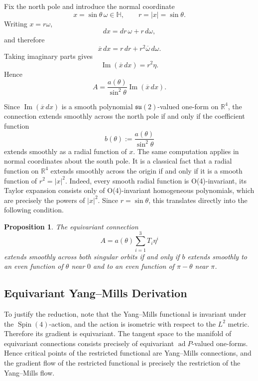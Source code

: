 \documentclass[11pt,a4paper]{article}
\numberwithin{equation}{section}
\theoremstyle{plain}
\newtheorem{proposition}[theorem]{Proposition}
\theoremstyle{remark}
\begin{document}
Fix the north pole and introduce the normal coordinate
$$
x=\sin\theta\,\omega\in\mathbb H,
\qquad
r=|x|=\sin\theta.
$$
Writing $x=r\omega$,
$$
dx=dr\,\omega+r\,d\omega,
$$
and therefore
$$
\overline x\,dx
=
r\,dr+r^2\overline\omega\,d\omega.
$$
Taking imaginary parts gives
$$
\operatorname{Im}(\overline x\,dx)
=
r^2\eta.
$$
Hence
$$
A
=
\frac{a(\theta)}{\sin^2\theta}
\operatorname{Im}(\overline x\,dx).
$$

Since
$\operatorname{Im}(\overline x\,dx)$ is a smooth polynomial
$\mathfrak{su}(2)$-valued one-form on $\mathbb R^4$, the connection
extends smoothly across the north pole if and only if the coefficient function 
$$
b(\theta):=\frac{a(\theta)}{\sin^2\theta}
$$
extends smoothly as a radial function of
$x$. The same computation applies in normal coordinates about the south
pole. It is a classical fact that a radial function on
$\mathbb R^4$ extends smoothly across the origin if and only if it is a
smooth function of $r^2=|x|^2$. Indeed, every smooth radial function is O(4)-invariant, its Taylor expansion consists only of O(4)-invariant homogeneous polynomials, which are precisely the powers of $|x|^2$. Since $r=\sin\theta$, this translates
directly into the following condition.

\begin{proposition}\label{smoothextension}
The equivariant connection
$$
A
=
a(\theta)\sum_{i=1}^3T_i\eta^i
$$
extends smoothly across both singular orbits if and only if $b$ extends
smoothly to an even function of $\theta$ near $0$ and to an even
function of $\pi-\theta$ near $\pi$.
\end{proposition}

\subsection{Equivariant Yang--Mills Derivation}
To justify the reduction, note that the Yang–Mills functional is invariant under the $\operatorname{Spin}(4)$-action, and the action is isometric with respect to the $L^2$ metric. Therefore its gradient is equivariant. The tangent space to the manifold of equivariant connections consists precisely of equivariant $\operatorname{ad}P$-valued one-forms. Hence critical points of the restricted functional are Yang--Mills connections, and the gradient flow of the restricted functional is precisely the restriction of the Yang--Mills flow.
\end{document}
